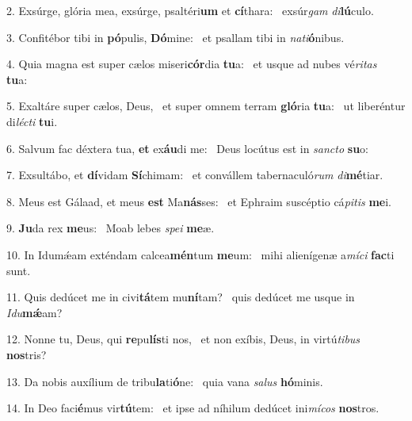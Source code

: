 2. Exsúrge, glória mea, exsúrge, psaltéri\textbf{um} et \textbf{cí}thara: \ast\  exsúr\textit{gam} \textit{di}\textbf{lú}culo.\

3. Confitébor tibi in \textbf{pó}pulis, \textbf{Dó}mine: \ast\  et psallam tibi in \textit{na}\textit{ti}\textbf{ó}nibus.\

4. Quia magna est super cælos miseri\textbf{cór}dia \textbf{tu}a: \ast\  et usque ad nubes vé\textit{ri}\textit{tas} \textbf{tu}a:\

5. Exaltáre super cælos, Deus, \dag\  et super omnem terram \textbf{gló}ria \textbf{tu}a: \ast\  ut liberéntur di\textit{léc}\textit{ti} \textbf{tu}i.\

6. Salvum fac déxtera tua, \textbf{et} ex\textbf{áu}di me: \ast\  Deus locútus est in \textit{sanc}\textit{to} \textbf{su}o:\

7. Exsultábo, et \textbf{dí}vidam \textbf{Sí}chimam: \ast\  et convállem tabernaculó\textit{rum} \textit{di}\textbf{mé}tiar.\

8. Meus est Gálaad, et meus \textbf{est} Ma\textbf{nás}ses: \ast\  et Ephraim suscéptio cá\textit{pi}\textit{tis} \textbf{me}i.\

9. \textbf{Ju}da rex \textbf{me}us: \ast\  Moab lebes \textit{spe}\textit{i} \textbf{me}æ.\

10. In Idumǽam exténdam calcea\textbf{mén}tum \textbf{me}um: \ast\  mihi alienígenæ a\textit{mí}\textit{ci} \textbf{fac}ti sunt.\

11. Quis dedúcet me in civi\textbf{tá}tem mu\textbf{ní}tam? \ast\  quis dedúcet me usque in \textit{I}\textit{du}\textbf{mǽ}am?\

12. Nonne tu, Deus, qui \textbf{re}pu\textbf{lís}ti nos, \ast\  et non exíbis, Deus, in virtú\textit{ti}\textit{bus} \textbf{nos}tris?\

13. Da nobis auxílium de tribu\textbf{la}ti\textbf{ó}ne: \ast\  quia vana \textit{sa}\textit{lus} \textbf{hó}minis.\

14. In Deo faci\textbf{é}mus vir\textbf{tú}tem: \ast\  et ipse ad níhilum dedúcet ini\textit{mí}\textit{cos} \textbf{nos}tros.\

